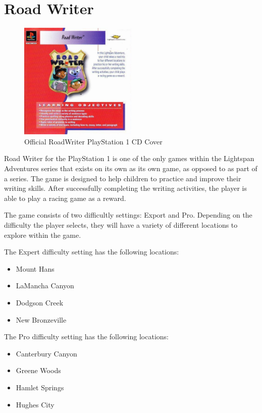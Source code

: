 \chapter{Road Writer}

\begin{figure}[H]
    \centering
    \includegraphics[width=0.5\textwidth]{"./Games/RoadWriter/Images/RoadWriterCDCover.jpg"}
    \caption{Official RoadWriter PlayStation 1 CD Cover}
\end{figure}

Road Writer for the PlayStation 1 is one of the only games within the Lightspan Adventures series that exists on its own as its own game, as opposed to as part of a series.
The game is designed to help children to practice and improve their writing skills.
After successfully completing the writing activities, the player is able to play a racing game as a reward.

The game consists of two difficultly settings: Export and Pro.
Depending on the difficulty the player selects, they will have a variety of different locations to explore within the game.

The Expert difficulty setting has the following locations:

\begin{itemize}
    \item Mount Hans
    \item LaMancha Canyon
    \item Dodgson Creek
    \item New Bronzeville
\end{itemize}

The Pro difficulty setting has the following locations:

\begin{itemize}
    \item Canterbury Canyon
    \item Greene Woods
    \item Hamlet Springs
    \item Hughes City
\end{itemize}

